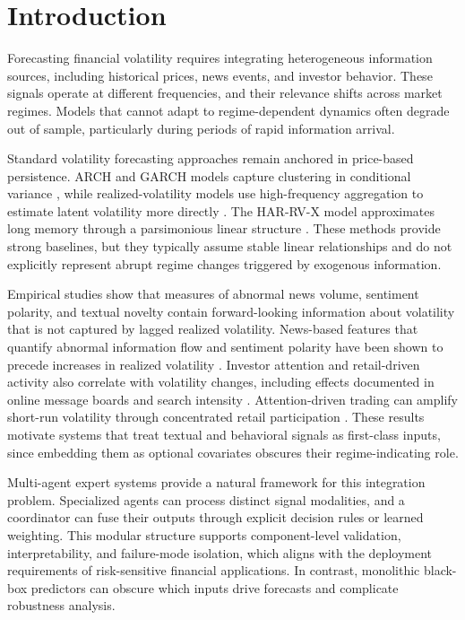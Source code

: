 \documentclass[review]{elsarticle}
\begin{document}
\section{Introduction}\label{introduction}

Forecasting financial volatility requires integrating heterogeneous information sources, including historical prices, news events, and investor behavior. These signals operate at different frequencies, and their relevance shifts across market regimes. Models that cannot adapt to regime-dependent dynamics often degrade out of sample, particularly during periods of rapid information arrival.

Standard volatility forecasting approaches remain anchored in price-based persistence. ARCH and GARCH models capture clustering in conditional variance \cite{engle1982,bollerslev1986}, while realized-volatility models use high-frequency aggregation to estimate latent volatility more directly \cite{andersen2001}. The HAR-RV-X model approximates long memory through a parsimonious linear structure \cite{corsi2009}. These methods provide strong baselines, but they typically assume stable linear relationships and do not explicitly represent abrupt regime changes triggered by exogenous information.

Empirical studies show that measures of abnormal news volume, sentiment polarity, and textual novelty contain forward-looking information about volatility that is not captured by lagged realized volatility. News-based features that quantify abnormal information flow and sentiment polarity have been shown to precede increases in realized volatility \cite{glasserman2019,bodilsen2025}. Investor attention and retail-driven activity also correlate with volatility changes, including effects documented in online message boards and search intensity \cite{antweiler2004,vlastakis2012}. Attention-driven trading can amplify short-run volatility through concentrated retail participation \cite{barber2008}. These results motivate systems that treat textual and behavioral signals as first-class inputs, since embedding them as optional covariates obscures their regime-indicating role.

Multi-agent expert systems provide a natural framework for this integration problem. Specialized agents can process distinct signal modalities, and a coordinator can fuse their outputs through explicit decision rules or learned weighting. This modular structure supports component-level validation, interpretability, and failure-mode isolation, which aligns with the deployment requirements of risk-sensitive financial applications. In contrast, monolithic black-box predictors can obscure which inputs drive forecasts and complicate robustness analysis.
\end{document}
